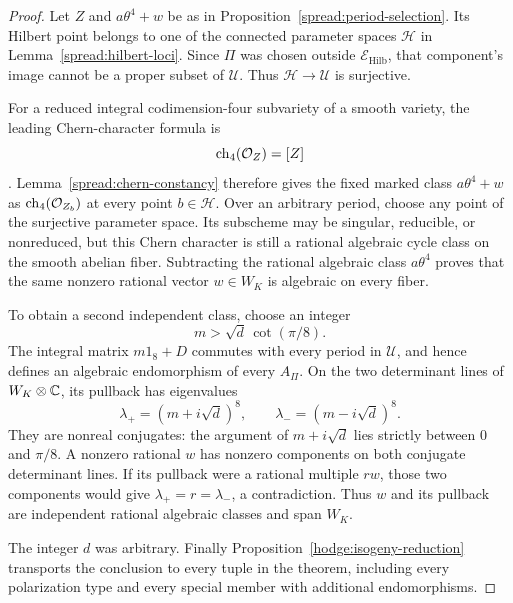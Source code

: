 \begin{proof}
Let $Z$ and $a\theta^4+w$ be as in
Proposition~\ref{spread:period-selection}.  Its Hilbert point belongs
to one of the connected parameter spaces $\mathcal H$ in
Lemma~\ref{spread:hilbert-loci}.  Since $\Pi$ was chosen outside
$\mathcal E_{\mathrm{Hilb}}$, that component's image cannot be a
proper subset of $\mathcal U$.  Thus $\mathcal H\to\mathcal U$
is surjective.

For a reduced integral codimension-four subvariety of a smooth variety,
the leading Chern-character formula is
\[
 \operatorname{ch}_4(\mathcal O_Z)=[Z]
\]
\cite{fulton-intersection}.  Lemma~\ref{spread:chern-constancy}
therefore gives the fixed marked class $a\theta^4+w$ as
$\operatorname{ch}_4(\mathcal O_{Z_b})$ at every point $b\in\mathcal H$.
Over an arbitrary period, choose any point of the surjective parameter
space.  Its subscheme may be singular, reducible, or nonreduced, but
this Chern character is still a rational algebraic cycle class on the
smooth abelian fiber.  Subtracting the rational algebraic class
$a\theta^4$ proves that the same nonzero rational vector $w\in W_K$
is algebraic on every fiber.

To obtain a second independent class, choose an integer
\[
 m>\sqrt d\,\cot(\pi/8).
\]
The integral matrix $m1_8+D$ commutes with every period in $\mathcal U$,
and hence defines an algebraic endomorphism of every $A_\Pi$.  On the
two determinant lines of $W_K\otimes\mathbb C$, its pullback has eigenvalues
\[
 \lambda_+=(m+i\sqrt d)^8,\qquad
 \lambda_-=(m-i\sqrt d)^8.
\]
They are nonreal conjugates: the argument of $m+i\sqrt d$ lies
strictly between $0$ and $\pi/8$.  A nonzero rational $w$ has nonzero
components on both conjugate determinant lines.  If its pullback were
a rational multiple $r w$, those two components would give
$\lambda_+=r=\lambda_-$, a contradiction.  Thus $w$ and its pullback
are independent rational algebraic classes and span $W_K$.

The integer $d$ was arbitrary.  Finally
Proposition~\ref{hodge:isogeny-reduction} transports the conclusion
to every tuple in the theorem, including every polarization type and
every special member with additional endomorphisms.
\end{proof}
